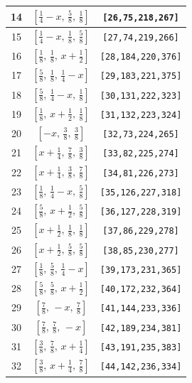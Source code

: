 \documentclass[fleqn,8pt]{jsarticle}
\begin{document}
\begin{longtable}{ccc}
14 & $\left[ \frac{1}{4} - x,\, \frac{5}{8},\, \frac{1}{8} \right]$ & {\tt [26,75,218,267]} \\ \hline
15 & $\left[ \frac{1}{4} - x,\, \frac{1}{8},\, \frac{5}{8} \right]$ & {\tt [27,74,219,266]} \\ \hline
16 & $\left[ \frac{1}{8},\, \frac{1}{8},\, x + \frac{1}{2} \right]$ & {\tt [28,184,220,376]} \\ \hline
17 & $\left[ \frac{5}{8},\, \frac{1}{8},\, \frac{1}{4} - x \right]$ & {\tt [29,183,221,375]} \\ \hline
18 & $\left[ \frac{5}{8},\, \frac{1}{4} - x,\, \frac{1}{8} \right]$ & {\tt [30,131,222,323]} \\ \hline
19 & $\left[ \frac{1}{8},\, x + \frac{1}{2},\, \frac{1}{8} \right]$ & {\tt [31,132,223,324]} \\ \hline
20 & $\left[ - x,\, \frac{3}{8},\, \frac{3}{8} \right]$ & {\tt [32,73,224,265]} \\ \hline
21 & $\left[ x + \frac{1}{4},\, \frac{7}{8},\, \frac{3}{8} \right]$ & {\tt [33,82,225,274]} \\ \hline
22 & $\left[ x + \frac{1}{4},\, \frac{3}{8},\, \frac{7}{8} \right]$ & {\tt [34,81,226,273]} \\ \hline
23 & $\left[ \frac{1}{8},\, \frac{1}{4} - x,\, \frac{5}{8} \right]$ & {\tt [35,126,227,318]} \\ \hline
24 & $\left[ \frac{5}{8},\, x + \frac{1}{2},\, \frac{5}{8} \right]$ & {\tt [36,127,228,319]} \\ \hline
25 & $\left[ x + \frac{1}{2},\, \frac{1}{8},\, \frac{1}{8} \right]$ & {\tt [37,86,229,278]} \\ \hline
26 & $\left[ x + \frac{1}{2},\, \frac{5}{8},\, \frac{5}{8} \right]$ & {\tt [38,85,230,277]} \\ \hline
27 & $\left[ \frac{1}{8},\, \frac{5}{8},\, \frac{1}{4} - x \right]$ & {\tt [39,173,231,365]} \\ \hline
28 & $\left[ \frac{5}{8},\, \frac{5}{8},\, x + \frac{1}{2} \right]$ & {\tt [40,172,232,364]} \\ \hline
29 & $\left[ \frac{7}{8},\, - x,\, \frac{7}{8} \right]$ & {\tt [41,144,233,336]} \\ \hline
30 & $\left[ \frac{7}{8},\, \frac{7}{8},\, - x \right]$ & {\tt [42,189,234,381]} \\ \hline
31 & $\left[ \frac{3}{8},\, \frac{7}{8},\, x + \frac{1}{4} \right]$ & {\tt [43,191,235,383]} \\ \hline
32 & $\left[ \frac{3}{8},\, x + \frac{1}{4},\, \frac{7}{8} \right]$ & {\tt [44,142,236,334]} \\ \hline

\end{longtable}
\end{document}

